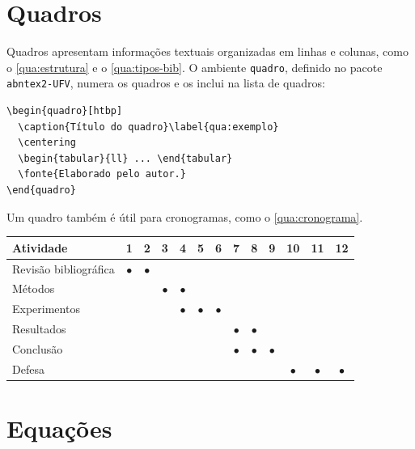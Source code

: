 \section{Quadros}\label{sec:quadros}

Quadros apresentam informações textuais organizadas em linhas e colunas, como o \autoref{qua:estrutura} e o \autoref{qua:tipos-bib}. O ambiente \texttt{quadro}, definido no pacote \texttt{abntex2-UFV}, numera os quadros e os inclui na lista de quadros:

\begin{verbatim}
\begin{quadro}[htbp]
  \caption{Título do quadro}\label{qua:exemplo}
  \centering
  \begin{tabular}{ll} ... \end{tabular}
  \fonte{Elaborado pelo autor.}
\end{quadro}
\end{verbatim}

Um quadro também é útil para cronogramas, como o \autoref{qua:cronograma}.

\begin{quadro}[htbp]
	\caption{Cronograma do trabalho, em meses}\label{qua:cronograma}
	\centering
	\footnotesize
	\begin{tabular}{lcccccccccccc}
		\toprule
		\textbf{Atividade} & \textbf{1} & \textbf{2} & \textbf{3} & \textbf{4} & \textbf{5} & \textbf{6} & \textbf{7} & \textbf{8} & \textbf{9} & \textbf{10} & \textbf{11} & \textbf{12} \\
		\midrule
		Revisão bibliográfica & $\bullet$ & $\bullet$ & & & & & & & & & & \\
		Métodos & & & $\bullet$ & $\bullet$ & & & & & & & & \\
		Experimentos & & & & $\bullet$ & $\bullet$ & $\bullet$ & & & & & & \\
		Resultados & & & & & & & $\bullet$ & $\bullet$ & & & & \\
		Conclusão & & & & & & & $\bullet$ & $\bullet$ & $\bullet$ & & & \\
		Defesa & & & & & & & & & & $\bullet$ & $\bullet$ & $\bullet$ \\
		\bottomrule
	\end{tabular}
\end{quadro}

\section{Equações}\label{sec:equacoes}


